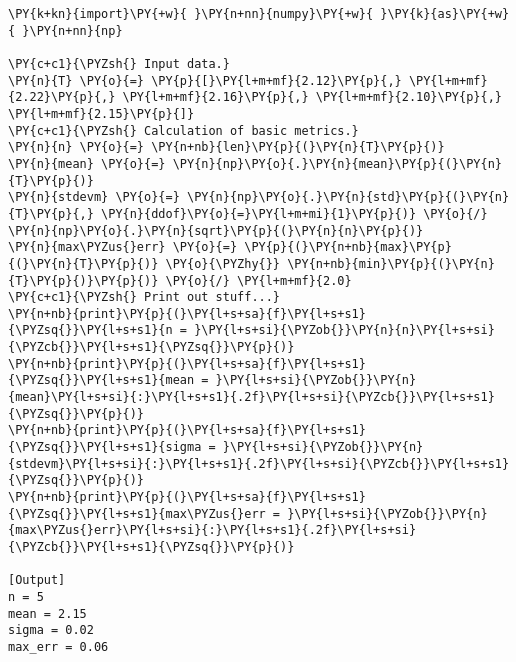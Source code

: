 \begin{Verbatim}[label=\makebox{\href{https://github.com/unipi-physics-labs/statnotes/tree/main/snippy/mean_stdev.py}{https://github.com/.../mean\_stdev.py}},commandchars=\\\{\}]
\PY{k+kn}{import}\PY{+w}{ }\PY{n+nn}{numpy}\PY{+w}{ }\PY{k}{as}\PY{+w}{ }\PY{n+nn}{np}

\PY{c+c1}{\PYZsh{} Input data.}
\PY{n}{T} \PY{o}{=} \PY{p}{[}\PY{l+m+mf}{2.12}\PY{p}{,} \PY{l+m+mf}{2.22}\PY{p}{,} \PY{l+m+mf}{2.16}\PY{p}{,} \PY{l+m+mf}{2.10}\PY{p}{,} \PY{l+m+mf}{2.15}\PY{p}{]}
\PY{c+c1}{\PYZsh{} Calculation of basic metrics.}
\PY{n}{n} \PY{o}{=} \PY{n+nb}{len}\PY{p}{(}\PY{n}{T}\PY{p}{)}
\PY{n}{mean} \PY{o}{=} \PY{n}{np}\PY{o}{.}\PY{n}{mean}\PY{p}{(}\PY{n}{T}\PY{p}{)}
\PY{n}{stdevm} \PY{o}{=} \PY{n}{np}\PY{o}{.}\PY{n}{std}\PY{p}{(}\PY{n}{T}\PY{p}{,} \PY{n}{ddof}\PY{o}{=}\PY{l+m+mi}{1}\PY{p}{)} \PY{o}{/} \PY{n}{np}\PY{o}{.}\PY{n}{sqrt}\PY{p}{(}\PY{n}{n}\PY{p}{)}
\PY{n}{max\PYZus{}err} \PY{o}{=} \PY{p}{(}\PY{n+nb}{max}\PY{p}{(}\PY{n}{T}\PY{p}{)} \PY{o}{\PYZhy{}} \PY{n+nb}{min}\PY{p}{(}\PY{n}{T}\PY{p}{)}\PY{p}{)} \PY{o}{/} \PY{l+m+mf}{2.0}
\PY{c+c1}{\PYZsh{} Print out stuff...}
\PY{n+nb}{print}\PY{p}{(}\PY{l+s+sa}{f}\PY{l+s+s1}{\PYZsq{}}\PY{l+s+s1}{n = }\PY{l+s+si}{\PYZob{}}\PY{n}{n}\PY{l+s+si}{\PYZcb{}}\PY{l+s+s1}{\PYZsq{}}\PY{p}{)}
\PY{n+nb}{print}\PY{p}{(}\PY{l+s+sa}{f}\PY{l+s+s1}{\PYZsq{}}\PY{l+s+s1}{mean = }\PY{l+s+si}{\PYZob{}}\PY{n}{mean}\PY{l+s+si}{:}\PY{l+s+s1}{.2f}\PY{l+s+si}{\PYZcb{}}\PY{l+s+s1}{\PYZsq{}}\PY{p}{)}
\PY{n+nb}{print}\PY{p}{(}\PY{l+s+sa}{f}\PY{l+s+s1}{\PYZsq{}}\PY{l+s+s1}{sigma = }\PY{l+s+si}{\PYZob{}}\PY{n}{stdevm}\PY{l+s+si}{:}\PY{l+s+s1}{.2f}\PY{l+s+si}{\PYZcb{}}\PY{l+s+s1}{\PYZsq{}}\PY{p}{)}
\PY{n+nb}{print}\PY{p}{(}\PY{l+s+sa}{f}\PY{l+s+s1}{\PYZsq{}}\PY{l+s+s1}{max\PYZus{}err = }\PY{l+s+si}{\PYZob{}}\PY{n}{max\PYZus{}err}\PY{l+s+si}{:}\PY{l+s+s1}{.2f}\PY{l+s+si}{\PYZcb{}}\PY{l+s+s1}{\PYZsq{}}\PY{p}{)}

[Output]
n = 5
mean = 2.15
sigma = 0.02
max_err = 0.06
\end{Verbatim}
